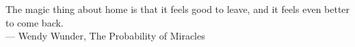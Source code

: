 \thispagestyle{empty}
{}

\vspace*{3cm}


\begin{center}
    The magic thing about home is that it feels good to leave, and it feels even better to come back. \\ \medskip
    --- Wendy Wunder, The Probability of Miracles
\end{center}

\medskip

